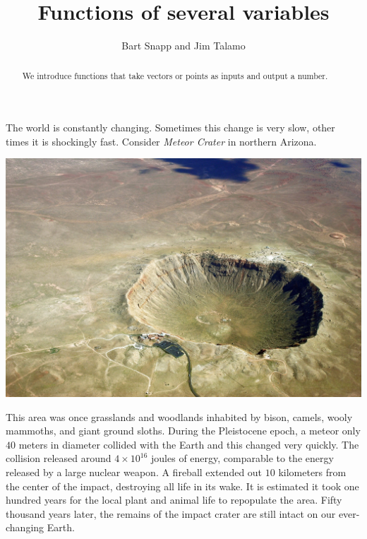\documentclass{ximera}
\author{Bart Snapp and Jim Talamo}
\title[Dig-In:]{Functions of several variables}
\begin{document}
\begin{abstract}
  We introduce functions that take vectors or points as inputs and
  output a number.
\end{abstract}
\maketitle

The world is constantly changing. Sometimes this change is very slow,
other times it is shockingly fast. Consider \textit{Meteor Crater} in
northern Arizona.
\begin{image}[3in]
  \includegraphics{meteorcrater.jpg}
\end{image}
This area was once grasslands and woodlands inhabited by bison,
camels, wooly mammoths, and giant ground sloths. During the
Pleistocene epoch, a meteor only $40$ meters in diameter collided
with the Earth and this changed very quickly. The collision released
around $4\times10^{16}$ joules of energy, comparable to the energy
released by a large nuclear weapon. A fireball extended out $10$
kilometers from the center of the impact, destroying all life in its
wake. It is estimated it took one hundred years for the local plant
and animal life to repopulate the area.  Fifty thousand years later,
the remains of the impact crater are still intact on our ever-changing
Earth.
\end{document}
